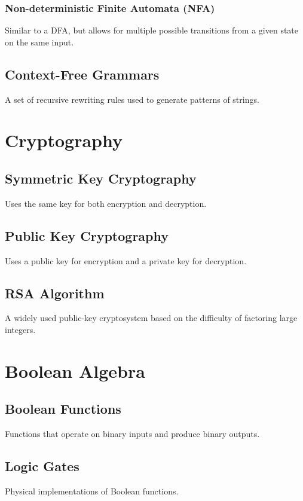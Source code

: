 \documentclass{article}
\begin{document}
\subsubsection{Non-deterministic Finite Automata (NFA)}
Similar to a DFA, but allows for multiple possible transitions from a given state on the same input.

\subsection{Context-Free Grammars}
A set of recursive rewriting rules used to generate patterns of strings.

\section{Cryptography}

\subsection{Symmetric Key Cryptography}
Uses the same key for both encryption and decryption.

\subsection{Public Key Cryptography}
Uses a public key for encryption and a private key for decryption.

\subsection{RSA Algorithm}
A widely used public-key cryptosystem based on the difficulty of factoring large integers.

\section{Boolean Algebra}

\subsection{Boolean Functions}
Functions that operate on binary inputs and produce binary outputs.

\subsection{Logic Gates}
Physical implementations of Boolean functions.
\end{document}
